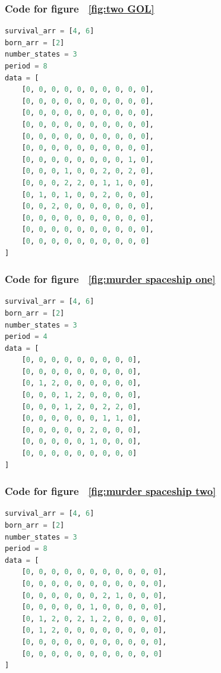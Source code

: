 \documentclass[12pt]{article}
\numberwithin{figure}{section} %
\begin{document}
\subsubsection{Code for figure ~\ref{fig:two GOL}}
\label{subsubsection:two GOL}
\begin{lstlisting}[language = Python]
survival_arr = [4, 6]
born_arr = [2]
number_states = 3
period = 8
data = [
    [0, 0, 0, 0, 0, 0, 0, 0, 0, 0],
    [0, 0, 0, 0, 0, 0, 0, 0, 0, 0],
    [0, 0, 0, 0, 0, 0, 0, 0, 0, 0],
    [0, 0, 0, 0, 0, 0, 0, 0, 0, 0],
    [0, 0, 0, 0, 0, 0, 0, 0, 0, 0],
    [0, 0, 0, 0, 0, 0, 0, 0, 0, 0],
    [0, 0, 0, 0, 0, 0, 0, 0, 1, 0],
    [0, 0, 0, 1, 0, 0, 2, 0, 2, 0],
    [0, 0, 0, 2, 2, 0, 1, 1, 0, 0],
    [0, 1, 0, 1, 0, 0, 2, 0, 0, 0],
    [0, 0, 2, 0, 0, 0, 0, 0, 0, 0],
    [0, 0, 0, 0, 0, 0, 0, 0, 0, 0],
    [0, 0, 0, 0, 0, 0, 0, 0, 0, 0],
    [0, 0, 0, 0, 0, 0, 0, 0, 0, 0]
]
\end{lstlisting}

\subsubsection{Code for figure ~\ref{fig:murder spaceship one}}
\label{subsubsection:murder spaceship one}
\begin{lstlisting}[language = Python]
survival_arr = [4, 6]
born_arr = [2]
number_states = 3
period = 4
data = [
    [0, 0, 0, 0, 0, 0, 0, 0, 0],
    [0, 0, 0, 0, 0, 0, 0, 0, 0],
    [0, 1, 2, 0, 0, 0, 0, 0, 0],
    [0, 0, 0, 1, 2, 0, 0, 0, 0],
    [0, 0, 0, 1, 2, 0, 2, 2, 0],
    [0, 0, 0, 0, 0, 0, 1, 1, 0],
    [0, 0, 0, 0, 0, 2, 0, 0, 0],
    [0, 0, 0, 0, 0, 1, 0, 0, 0],
    [0, 0, 0, 0, 0, 0, 0, 0, 0]
]
\end{lstlisting}

\subsubsection{Code for figure ~\ref{fig:murder spaceship two}}
\label{subsubsection:murder spaceship two}
\begin{lstlisting}[language = Python]
survival_arr = [4, 6]
born_arr = [2]
number_states = 3
period = 8
data = [
    [0, 0, 0, 0, 0, 0, 0, 0, 0, 0, 0],
    [0, 0, 0, 0, 0, 0, 0, 0, 0, 0, 0],
    [0, 0, 0, 0, 0, 0, 2, 1, 0, 0, 0],
    [0, 0, 0, 0, 0, 1, 0, 0, 0, 0, 0],
    [0, 1, 2, 0, 2, 1, 2, 0, 0, 0, 0],
    [0, 1, 2, 0, 0, 0, 0, 0, 0, 0, 0],
    [0, 0, 0, 0, 0, 0, 0, 0, 0, 0, 0], 
    [0, 0, 0, 0, 0, 0, 0, 0, 0, 0, 0]
]
\end{lstlisting}
\end{document}

